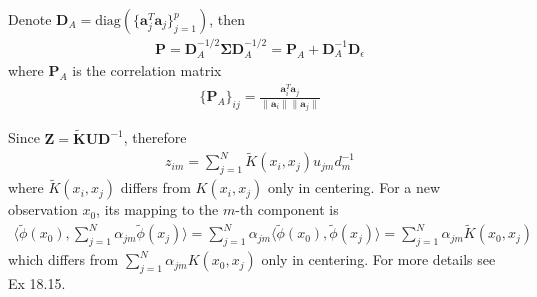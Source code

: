 \begin{exercise}[(Program)]
\end{exercise}

\begin{exercise}
  Denote $\mathbf{D}_A=\mbox{diag}(\{\mathbf{a}_j^T\mathbf{a}_j\}_{j=1}^p)$,
  then
  \begin{align}
    \mathbf{P} = \mathbf{D}_A^{-1/2} \mathbf{\Sigma} \mathbf{D}_A^{-1/2} =
    \mathbf{P}_A + \mathbf{D}_A^{-1}\mathbf{D}_{\epsilon}
  \end{align}
  where $\mathbf{P}_A $ is the correlation matrix
  \begin{align}
    \{\mathbf{P}_A\}_{ij} = \frac{\mathbf{a}_i^T\mathbf{a}_j}
    {\|\mathbf{a}_i\|\|\mathbf{a}_j\|}
  \end{align}
\end{exercise}

\begin{exercise}[(Program)]
\end{exercise}

\begin{exercise}
  Since $\mathbf{Z} = \tilde{\mathbf{K}}\mathbf{UD}^{-1}$, therefore
  \begin{align}
    z_{im} = \sum_{j=1}^N\tilde{K}(x_i, x_j)u_{jm}d_m^{-1}
  \end{align}
  where $\tilde{K}(x_i, x_j)$ differs from $K(x_i, x_j)$ only in centering. For
  a new observation $x_0$, its mapping to the $m$-th component is 
  \begin{align}
    \langle\tilde{\phi}(x_0), \sum_{j = 1}^N\alpha_{jm}\tilde{\phi}(x_j)\rangle =
    \sum_{j = 1}^N\alpha_{jm}\langle\tilde{\phi}(x_0), \tilde{\phi}(x_j)\rangle
    = \sum_{j=1}^N \alpha_{jm} \tilde{K}(x_0, x_j)
  \end{align}
  which differs from $\sum_{j=1}^N \alpha_{jm} K(x_0, x_j)$ only in centering.
  For more details see Ex 18.15.
  
\end{exercise}

